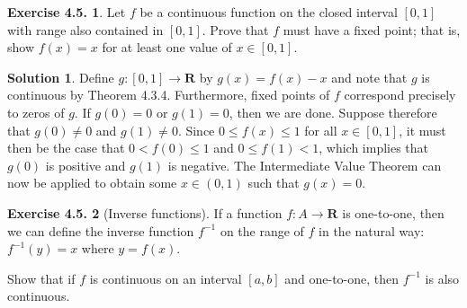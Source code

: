 \documentclass[12pt]{article}
\theoremstyle{definition}
\theoremstyle{exercise}
\newtheorem{exercise}{Exercise 4.5.}
\theoremstyle{solution}
\newtheorem*{solution}{Solution}
\newcommand{\R}{\mathbf{R}}
\begin{document}
\begin{exercise}
\label{ex:7}
    Let \( f \) be a continuous function on the closed interval \( [0, 1] \) with range also contained in \( [0, 1] \). Prove that \( f \) must have a fixed point; that is, show \( f(x) = x \) for at least one value of \( x \in [0, 1] \).
\end{exercise}

\begin{solution}
    Define \( g : [0, 1] \to \R \) by \( g(x) = f(x) - x \) and note that \( g \) is continuous by Theorem 4.3.4. Furthermore, fixed points of \( f \) correspond precisely to zeros of \( g \). If \( g(0) = 0 \) or \( g(1) = 0 \), then we are done. Suppose therefore that \( g(0) \neq 0 \) and \( g(1) \neq 0 \). Since \( 0 \leq f(x) \leq 1 \) for all \( x \in [0, 1] \), it must then be the case that \( 0 < f(0) \leq 1 \) and \( 0 \leq f(1) < 1 \), which implies that \( g(0) \) is positive and \( g(1) \) is negative. The Intermediate Value Theorem can now be applied to obtain some \( x \in (0, 1) \) such that \( g(x) = 0 \).
\end{solution}

\begin{exercise}[Inverse functions]
\label{ex:8}
    If a function \( f : A \to \R \) is one-to-one, then we can define the inverse function \( f^{-1} \) on the range of \( f \) in the natural way: \( f^{-1}(y) = x \) where \( y = f(x) \).

    Show that if \( f \) is continuous on an interval \( [a, b] \) and one-to-one, then \( f^{-1} \) is also continuous.
\end{exercise}
\end{document}
